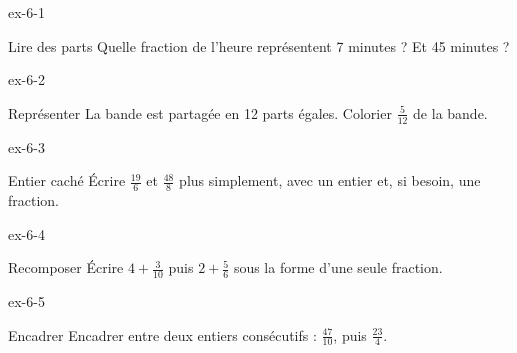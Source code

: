 \clearpage{}
\begin{blocLivre}{ex-6-1}\begin{exercice}[1]{Lire des parts}
Quelle fraction de l’heure représentent 7 minutes ? Et 45 minutes ?
\end{exercice}\end{blocLivre}
\begin{blocLivre}{ex-6-2}\begin{exercice}[1]{Représenter}
La bande est partagée en 12 parts égales. Colorier $\frac5{12}$ de la bande.
\label{fig-ex-6-2}
\end{exercice}\end{blocLivre}
\begin{blocLivre}{ex-6-3}\begin{exercice}[1]{Entier caché}
Écrire $\frac{19}6$ et $\frac{48}8$ plus simplement, avec un entier et, si besoin, une fraction.
\end{exercice}\end{blocLivre}
\begin{blocLivre}{ex-6-4}\begin{exercice}[1]{Recomposer}
Écrire $4+\frac3{10}$ puis $2+\frac56$ sous la forme d’une seule fraction.
\end{exercice}\end{blocLivre}
\begin{blocLivre}{ex-6-5}\begin{exercice}[1]{Encadrer}
Encadrer entre deux entiers consécutifs : $\frac{47}{10}$, puis $\frac{23}4$.
\end{exercice}\end{blocLivre}

